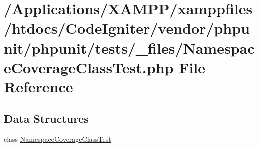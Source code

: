 \hypertarget{phpunit_2tests_2__files_2_namespace_coverage_class_test_8php}{}\section{/\+Applications/\+X\+A\+M\+P\+P/xamppfiles/htdocs/\+Code\+Igniter/vendor/phpunit/phpunit/tests/\+\_\+files/\+Namespace\+Coverage\+Class\+Test.php File Reference}
\label{phpunit_2tests_2__files_2_namespace_coverage_class_test_8php}
\subsection*{Data Structures}
\begin{DoxyCompactItemize}
\item 
class \mbox{\hyperlink{class_namespace_coverage_class_test}{Namespace\+Coverage\+Class\+Test}}
\end{DoxyCompactItemize}
